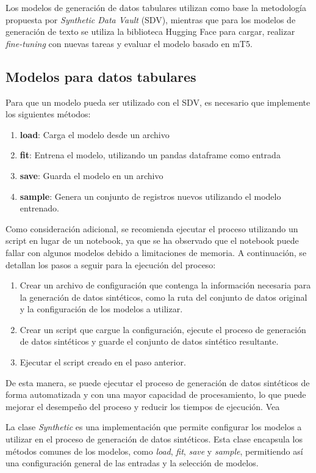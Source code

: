 Los modelos de generación de datos tabulares utilizan como base la metodología propuesta por \emph{Synthetic Data Vault} (SDV), mientras que para los modelos de generación de texto se utiliza la biblioteca Hugging Face para cargar, realizar \emph{fine-tuning} con nuevas tareas y evaluar el modelo basado en mT5.

\subsection{Modelos para datos tabulares}
Para que un modelo pueda ser utilizado con el SDV, es necesario que implemente los siguientes métodos:
\begin{enumerate}
    \item \textbf{load}: Carga el modelo desde un archivo
    \item \textbf{fit}: Entrena el modelo, utilizando un pandas dataframe como entrada
    \item \textbf{save}: Guarda el modelo en un archivo
    \item \textbf{sample}: Genera un conjunto de registros nuevos utilizando el modelo entrenado.
\end{enumerate}

Como consideración adicional, se recomienda ejecutar el proceso utilizando un script en lugar de un notebook, ya que se ha observado que el notebook puede fallar con algunos modelos debido a limitaciones de memoria. A continuación, se detallan los pasos a seguir para la ejecución del proceso:
\begin{enumerate}
\item Crear un archivo de configuración que contenga la información necesaria para la generación de datos sintéticos, como la ruta del conjunto de datos original y la configuración de los modelos a utilizar.
\item Crear un script que cargue la configuración, ejecute el proceso de generación de datos sintéticos y guarde el conjunto de datos sintético resultante.
\item Ejecutar el script creado en el paso anterior.
\end{enumerate}
De esta manera, se puede ejecutar el proceso de generación de datos sintéticos de forma automatizada y con una mayor capacidad de procesamiento, lo que puede mejorar el desempeño del proceso y reducir los tiempos de ejecución. Vea 

La clase \emph{Synthetic} es una implementación que permite configurar los modelos a utilizar en el proceso de generación de datos sintéticos. Esta clase encapsula los métodos comunes de los modelos, como \emph{load}, \emph{fit}, \emph{save} y \emph{sample}, permitiendo así una configuración general de las entradas y la selección de modelos.

